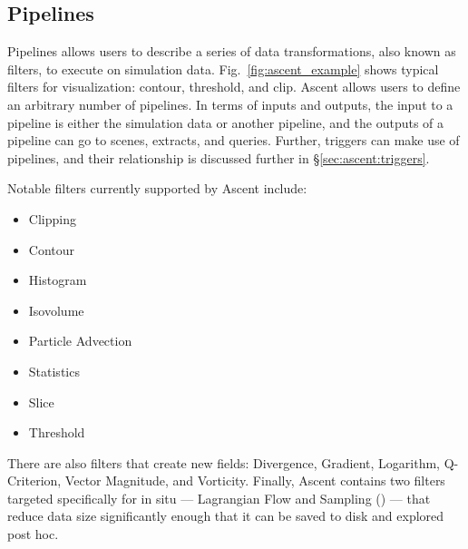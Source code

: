 \subsection{Pipelines}

Pipelines allows users to describe a series of data transformations, also known as filters,
to execute on simulation data.
%
Fig.~\ref{fig:ascent_example} shows
typical filters for visualization: contour, threshold, and clip.
%
Ascent allows users to define an arbitrary number of pipelines.
%
In terms of inputs and outputs, the input to a pipeline is either
the simulation data or another pipeline, and the outputs of a pipeline
can go to scenes, extracts, and queries.
%
Further, triggers can make use of pipelines, and their relationship is discussed further
in \S\ref{sec:ascent:triggers}.

%


Notable filters currently supported by Ascent include:
\begin{multicols}{2}
\begin{itemize}
\item Clipping
\item Contour
\item Histogram
\item Isovolume
\item Particle Advection
\item Statistics
\item Slice
\item Threshold
\end{itemize}
\end{multicols}

There are also filters that create new fields: Divergence, Gradient, Logarithm, Q-Criterion, Vector Magnitude, and Vorticity.
%
Finally, Ascent contains two filters targeted specifically for in situ --- Lagrangian Flow
and Sampling ()
--- that
reduce data size significantly enough that it can be saved to disk and explored post hoc.



